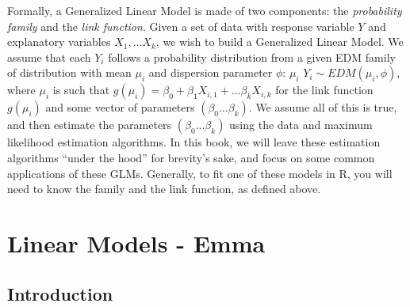 \documentclass[
]{book}
\begin{document}
Formally, a Generalized Linear Model is made of two components: the \emph{probability family} and the \emph{link function}. Given a set of data with response variable \(Y\) and explanatory variables \(X_1, ... X_k\), we wish to build a Generalized Linear Model. We assume that each \(Y_i\) follows a probability distribution from a given EDM family of distribution with mean \(\mu_i\) and dispersion parameter \(\phi\): \(\mu_i\) \(Y_i \sim EDM(\mu_i,\phi)\), where \(\mu_i\) is such that \(g(\mu_i) = \beta_0 + \beta_1X_{i,1} + ... \beta_kX_{i,k}\) for the link function \(g(\mu_i)\) and some vector of parameters \((\beta_0...\beta_k)\). We assume all of this is true, and then estimate the parameters \((\beta_0...\beta_k)\) using the data and maximum likelihood estimation algorithms. In this book, we will leave these estimation algorithms ``under the hood'' for brevity's sake, and focus on some common applications of these GLMs. Generally, to fit one of these models in R, you will need to know the family and the link function, as defined above.

\hypertarget{linear}{%
\chapter{Linear Models - Emma}\label{linear}}

\hypertarget{introduction}{%
\section{Introduction}\label{introduction}}
\end{document}
